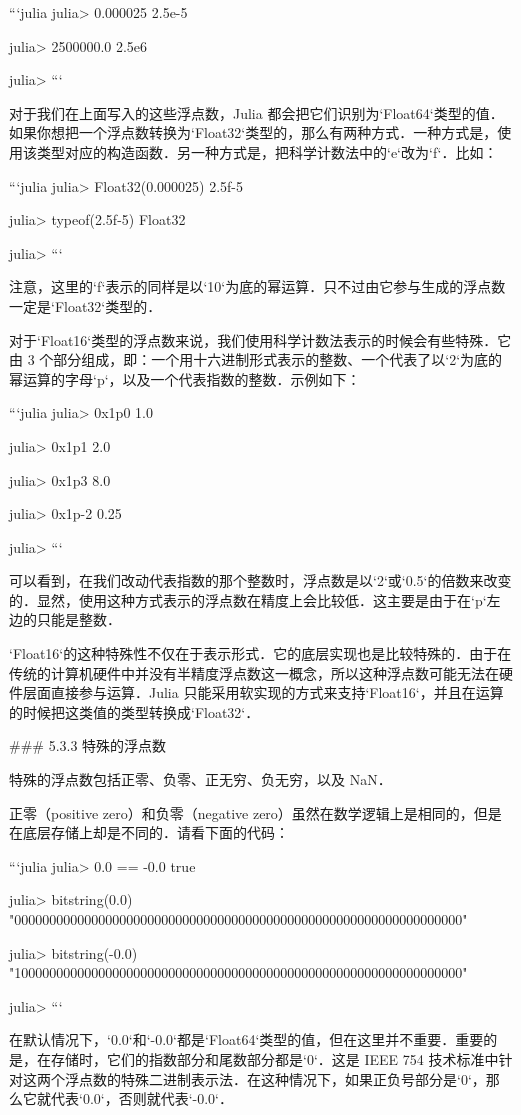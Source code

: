```julia
julia> 0.000025
2.5e-5

julia> 2500000.0
2.5e6

julia> 
```

对于我们在上面写入的这些浮点数，Julia 都会把它们识别为`Float64`类型的值．如果你想把一个浮点数转换为`Float32`类型的，那么有两种方式．一种方式是，使用该类型对应的构造函数．另一种方式是，把科学计数法中的`e`改为`f`．比如：

```julia
julia> Float32(0.000025)
2.5f-5

julia> typeof(2.5f-5)
Float32

julia> 
```

注意，这里的`f`表示的同样是以`10`为底的幂运算．只不过由它参与生成的浮点数一定是`Float32`类型的．

对于`Float16`类型的浮点数来说，我们使用科学计数法表示的时候会有些特殊．它由 3 个部分组成，即：一个用十六进制形式表示的整数、一个代表了以`2`为底的幂运算的字母`p`，以及一个代表指数的整数．示例如下：

```julia
julia> 0x1p0
1.0

julia> 0x1p1
2.0

julia> 0x1p3
8.0

julia> 0x1p-2
0.25

julia> 
```

可以看到，在我们改动代表指数的那个整数时，浮点数是以`2`或`0.5`的倍数来改变的．显然，使用这种方式表示的浮点数在精度上会比较低．这主要是由于在`p`左边的只能是整数．

`Float16`的这种特殊性不仅在于表示形式．它的底层实现也是比较特殊的．由于在传统的计算机硬件中并没有半精度浮点数这一概念，所以这种浮点数可能无法在硬件层面直接参与运算．Julia 只能采用软实现的方式来支持`Float16`，并且在运算的时候把这类值的类型转换成`Float32`．

### 5.3.3 特殊的浮点数

特殊的浮点数包括正零、负零、正无穷、负无穷，以及 NaN．

正零（positive zero）和负零（negative zero）虽然在数学逻辑上是相同的，但是在底层存储上却是不同的．请看下面的代码：

```julia
julia> 0.0 == -0.0 
true

julia> bitstring(0.0)
"0000000000000000000000000000000000000000000000000000000000000000"

julia> bitstring(-0.0)
"1000000000000000000000000000000000000000000000000000000000000000"

julia> 
```

在默认情况下，`0.0`和`-0.0`都是`Float64`类型的值，但在这里并不重要．重要的是，在存储时，它们的指数部分和尾数部分都是`0`．这是 IEEE 754 技术标准中针对这两个浮点数的特殊二进制表示法．在这种情况下，如果正负号部分是`0`，那么它就代表`0.0`，否则就代表`-0.0`．

